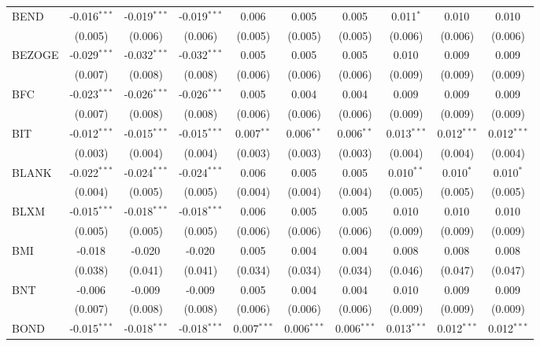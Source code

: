 \begin{table}[!htbp]
\begin{tabular}{@{\extracolsep{5pt}}lccccccccc}
 BEND & -0.016$^{***}$ & -0.019$^{***}$ & -0.019$^{***}$ & 0.006$^{}$ & 0.005$^{}$ & 0.005$^{}$ & 0.011$^{*}$ & 0.010$^{}$ & 0.010$^{}$ \\
  & (0.005) & (0.006) & (0.006) & (0.005) & (0.005) & (0.005) & (0.006) & (0.006) & (0.006) \\
 BEZOGE & -0.029$^{***}$ & -0.032$^{***}$ & -0.032$^{***}$ & 0.005$^{}$ & 0.005$^{}$ & 0.005$^{}$ & 0.010$^{}$ & 0.009$^{}$ & 0.009$^{}$ \\
  & (0.007) & (0.008) & (0.008) & (0.006) & (0.006) & (0.006) & (0.009) & (0.009) & (0.009) \\
 BFC & -0.023$^{***}$ & -0.026$^{***}$ & -0.026$^{***}$ & 0.005$^{}$ & 0.004$^{}$ & 0.004$^{}$ & 0.009$^{}$ & 0.009$^{}$ & 0.009$^{}$ \\
  & (0.007) & (0.008) & (0.008) & (0.006) & (0.006) & (0.006) & (0.009) & (0.009) & (0.009) \\
 BIT & -0.012$^{***}$ & -0.015$^{***}$ & -0.015$^{***}$ & 0.007$^{**}$ & 0.006$^{**}$ & 0.006$^{**}$ & 0.013$^{***}$ & 0.012$^{***}$ & 0.012$^{***}$ \\
  & (0.003) & (0.004) & (0.004) & (0.003) & (0.003) & (0.003) & (0.004) & (0.004) & (0.004) \\
 BLANK & -0.022$^{***}$ & -0.024$^{***}$ & -0.024$^{***}$ & 0.006$^{}$ & 0.005$^{}$ & 0.005$^{}$ & 0.010$^{**}$ & 0.010$^{*}$ & 0.010$^{*}$ \\
  & (0.004) & (0.005) & (0.005) & (0.004) & (0.004) & (0.004) & (0.005) & (0.005) & (0.005) \\
 BLXM & -0.015$^{***}$ & -0.018$^{***}$ & -0.018$^{***}$ & 0.006$^{}$ & 0.005$^{}$ & 0.005$^{}$ & 0.010$^{}$ & 0.010$^{}$ & 0.010$^{}$ \\
  & (0.005) & (0.005) & (0.005) & (0.006) & (0.006) & (0.006) & (0.009) & (0.009) & (0.009) \\
 BMI & -0.018$^{}$ & -0.020$^{}$ & -0.020$^{}$ & 0.005$^{}$ & 0.004$^{}$ & 0.004$^{}$ & 0.008$^{}$ & 0.008$^{}$ & 0.008$^{}$ \\
  & (0.038) & (0.041) & (0.041) & (0.034) & (0.034) & (0.034) & (0.046) & (0.047) & (0.047) \\
 BNT & -0.006$^{}$ & -0.009$^{}$ & -0.009$^{}$ & 0.005$^{}$ & 0.004$^{}$ & 0.004$^{}$ & 0.010$^{}$ & 0.009$^{}$ & 0.009$^{}$ \\
  & (0.007) & (0.008) & (0.008) & (0.006) & (0.006) & (0.006) & (0.009) & (0.009) & (0.009) \\
 BOND & -0.015$^{***}$ & -0.018$^{***}$ & -0.018$^{***}$ & 0.007$^{***}$ & 0.006$^{***}$ & 0.006$^{***}$ & 0.013$^{***}$ & 0.012$^{***}$ & 0.012$^{***}$ \\

\end{tabular}
\end{table}
